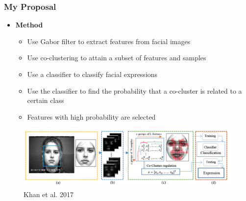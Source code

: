 \documentclass[11pt]{beamer}
\begin{document}
\begin{frame}
    \frametitle{My Proposal}
    \begin{itemize}
        \item \textbf{Method}
              \begin{itemize}
                  \item Use Gabor filter to extract features from facial images
                  \item Use co-clustering to attain a subset of features and samples
                  \item Use a classifier to classify facial expressions
                  \item Use the classifier to find the probability that a co-cluster is related to a certain class
                  \item Features with high probability are selected
              \end{itemize}
    \end{itemize}
    \begin{figure}[htbp]
        \centering
        \includegraphics[width=\textwidth]{khan.png}
        \caption{Khan et al. 2017}
    \end{figure}
\end{frame}
\end{document}

